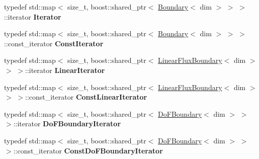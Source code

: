 \begin{DoxyCompactItemize}
\item 
\hypertarget{classnatrium_1_1BoundaryCollection_a48a9256fb603f1bc4b7e04b6feef0feb}{
typedef std::map$<$ size\_\-t, boost::shared\_\-ptr$<$ \hyperlink{classnatrium_1_1Boundary}{Boundary}$<$ dim $>$ $>$ $>$::iterator {\bfseries Iterator}}
\label{classnatrium_1_1BoundaryCollection_a48a9256fb603f1bc4b7e04b6feef0feb}

\item 
\hypertarget{classnatrium_1_1BoundaryCollection_ad617c979f5d65a32f669276fa18702da}{
typedef std::map$<$ size\_\-t, boost::shared\_\-ptr$<$ \hyperlink{classnatrium_1_1Boundary}{Boundary}$<$ dim $>$ $>$ $>$::const\_\-iterator {\bfseries ConstIterator}}
\label{classnatrium_1_1BoundaryCollection_ad617c979f5d65a32f669276fa18702da}

\item 
\hypertarget{classnatrium_1_1BoundaryCollection_a47cdf0b0d4ff41838c28b13714768af9}{
typedef std::map$<$ size\_\-t, boost::shared\_\-ptr$<$ \hyperlink{classnatrium_1_1LinearFluxBoundary}{LinearFluxBoundary}$<$ dim $>$ $>$ $>$::iterator {\bfseries LinearIterator}}
\label{classnatrium_1_1BoundaryCollection_a47cdf0b0d4ff41838c28b13714768af9}

\item 
\hypertarget{classnatrium_1_1BoundaryCollection_a886a6e984b43ab1ad7b79610b6960a6a}{
typedef std::map$<$ size\_\-t, boost::shared\_\-ptr$<$ \hyperlink{classnatrium_1_1LinearFluxBoundary}{LinearFluxBoundary}$<$ dim $>$ $>$ $>$::const\_\-iterator {\bfseries ConstLinearIterator}}
\label{classnatrium_1_1BoundaryCollection_a886a6e984b43ab1ad7b79610b6960a6a}

\item 
\hypertarget{classnatrium_1_1BoundaryCollection_a5dc656df5e72156bde252c308dadc36f}{
typedef std::map$<$ size\_\-t, boost::shared\_\-ptr$<$ \hyperlink{classnatrium_1_1DoFBoundary}{DoFBoundary}$<$ dim $>$ $>$ $>$::iterator {\bfseries DoFBoundaryIterator}}
\label{classnatrium_1_1BoundaryCollection_a5dc656df5e72156bde252c308dadc36f}

\item 
\hypertarget{classnatrium_1_1BoundaryCollection_ae4e01a670a4f0736dfd74274b59cb036}{
typedef std::map$<$ size\_\-t, boost::shared\_\-ptr$<$ \hyperlink{classnatrium_1_1DoFBoundary}{DoFBoundary}$<$ dim $>$ $>$ $>$::const\_\-iterator {\bfseries ConstDoFBoundaryIterator}}
\label{classnatrium_1_1BoundaryCollection_ae4e01a670a4f0736dfd74274b59cb036}


\end{DoxyCompactItemize}
